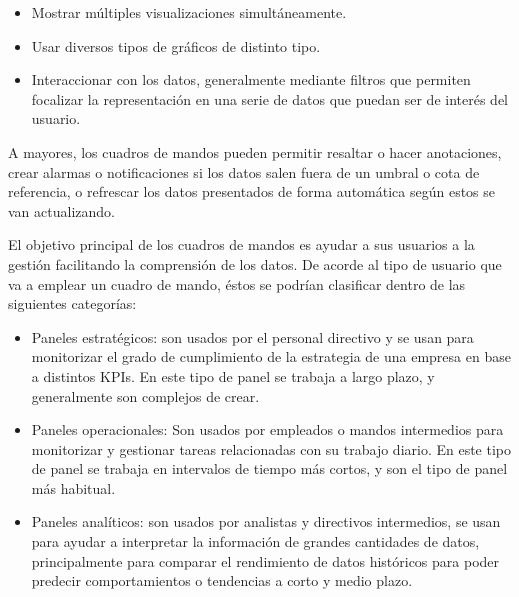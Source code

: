 \begin{itemize}
    \item Mostrar múltiples visualizaciones simultáneamente.
    \item Usar diversos tipos de gráficos de distinto tipo.       
    \item Interaccionar con los datos, generalmente mediante filtros que permiten focalizar la representación en una serie de datos que puedan ser de interés del usuario.
\end{itemize}

A mayores, los cuadros de mandos pueden permitir resaltar o hacer anotaciones, crear alarmas o notificaciones si los datos salen fuera de un umbral o cota de referencia, o refrescar los datos presentados de forma automática según estos se van actualizando.

El objetivo principal de los cuadros de mandos es ayudar a sus usuarios a la gestión facilitando la comprensión de los datos. De acorde al tipo de usuario que va a emplear un cuadro de mando, éstos se podrían clasificar dentro de las siguientes categorías:

\begin{itemize}
    \item Paneles estratégicos: son usados por el personal directivo y se usan para monitorizar el grado de cumplimiento de la estrategia de una empresa en base a distintos KPIs. En este tipo de panel se trabaja a largo plazo, y generalmente son complejos de crear.
    \item Paneles operacionales: Son usados por empleados o mandos intermedios para monitorizar y gestionar tareas relacionadas con su trabajo diario. En este tipo de panel se trabaja en intervalos de tiempo más cortos, y son el tipo de panel más habitual.
    \item Paneles analíticos: son usados por analistas y directivos intermedios, se usan para ayudar a interpretar la información de grandes cantidades de datos, principalmente para comparar el rendimiento de datos históricos para poder predecir comportamientos o tendencias a corto y medio plazo.
\end{itemize}
